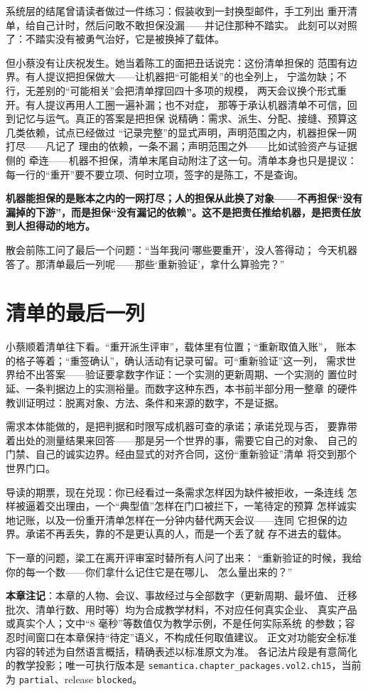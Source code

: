 系统层的结尾曾请读者做过一件练习：假装收到一封换型邮件，手工列出
重开清单，给自己计时，然后问敢不敢担保没漏——并记住那种不踏实。
此刻可以对照了：不踏实没有被勇气治好，它是被换掉了载体。

但小蔡没有让庆祝发生。她当着陈工的面把丑话说完：这份清单担保的
范围有边界。有人提议把担保做大——让机器把“可能相关”的也全列上，
宁滥勿缺；不行，无差别的“可能相关”会把清单撑回四十多项的规模，
两天会议换个形式重开。有人提议再用人工圈一遍补漏；也不对症，
那等于承认机器清单不可信，回到记忆与运气。真正的答案是把担保
说精确：需求、派生、分配、接缝、预算这几类依赖，试点已经做过
“记录完整”的显式声明，声明范围之内，机器担保一网打尽——凡记了
理由的依赖，一条不漏；声明范围之外——比如试验资产与证据侧的
牵连——机器不担保，清单末尾自动附注了这一句。清单本身也只是提议：
每一行的“重开”要不要立项、何时立项，签字的是陈工，不是查询。

\textbf{机器能担保的是账本之内的一网打尽；人的担保从此换了对象——不再担保“没有漏掉的下游”，而是担保“没有漏记的依赖”。这不是把责任推给机器，是把责任放到人担得动的地方。}

散会前陈工问了最后一个问题：“当年我问‘哪些要重开’，没人答得动；
今天机器答了。那清单最后一列呢——那些‘重新验证’，拿什么算验完？”

\section{清单的最后一列}

小蔡顺着清单往下看。“重开派生评审”，载体里有位置；“重新取值入账”，
账本的格子等着；“重签确认”，确认活动有记录可留。可“重新验证”这一列，
需求世界给不出答案——验证要拿数字作证：一个实测的更新周期、一个实测的
置位时延、一条判据边上的实测裕量。而数字这种东西，本书前半部分用一整章
的硬件教训证明过：脱离对象、方法、条件和来源的数字，不是证据。

需求本体能做的，是把判据和时限写成机器可查的承诺；承诺兑现与否，
要靠带着出处的测量结果来回答——那是另一个世界的事，需要它自己的对象、
自己的门禁、自己的诚实边界。经由显式的对齐合同，这份“重新验证”清单
将交到那个世界门口。

导读的期票，现在兑现：你已经看过一条需求怎样因为缺件被拒收，一条连线
怎样被逼着交出理由，一个“典型值”怎样在门口被拦下，一笔待定的预算
怎样诚实地记账，以及一份重开清单怎样在一分钟内替代两天会议——连同
它担保的边界。承诺不再丢失，靠的不是更认真的人，而是一个丢了就
存不进去的载体。

下一章的问题，梁工在离开评审室时替所有人问了出来：
“重新验证的时候，我给你的每一个数——你们拿什么记住它是在哪儿、
怎么量出来的？”


\begin{noteblock}
\textbf{本章注记}：本章的人物、会议、事故经过与全部数字（更新周期、最坏值、
迁移批次、清单行数、用时等）均为合成教学材料，不对应任何真实企业、
真实产品或真实个人；文中“8 毫秒”等数值仅为教学示例，不是任何实际系统
的参数；容忍时间窗口在本章保持“待定”语义，不构成任何取值建议。
正文对功能安全标准内容的转述为自然语言概括，精确表述以标准原文为准。
各记法片段是有意简化的教学投影；唯一可执行版本是
\nolinkurl{semantica.chapter_packages.vol2.ch15}，当前为 \nolinkurl{partial}、release \nolinkurl{blocked}。
\end{noteblock}
